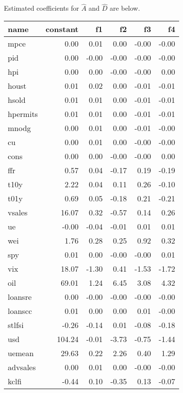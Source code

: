 \documentclass[11pt, letterpaper]{article}\usepackage[]{graphicx}\usepackage[]{color}
\begin{document}
Estimated coefficients for $\widehat{A}$ and $\widehat{D}$ are below.
\begin{table}[H]
\centering
\begingroup\footnotesize
\begin{tabular}{lrrrrr}
  \hline
name & constant & f1 & f2 & f3 & f4 \\ 
  \hline
mpce & 0.00 & 0.01 & 0.00 & -0.00 & -0.00 \\ 
  pid & 0.00 & -0.00 & -0.00 & -0.00 & -0.00 \\ 
  hpi & 0.00 & 0.00 & -0.00 & -0.00 & 0.00 \\ 
  houst & 0.01 & 0.02 & 0.00 & -0.01 & -0.01 \\ 
  hsold & 0.01 & 0.01 & 0.00 & -0.01 & -0.01 \\ 
  hpermits & 0.01 & 0.01 & 0.00 & -0.01 & -0.01 \\ 
  mnodg & 0.00 & 0.01 & 0.00 & -0.01 & -0.00 \\ 
  cu & 0.00 & 0.01 & 0.00 & -0.00 & -0.00 \\ 
  cons & 0.00 & 0.00 & -0.00 & -0.00 & 0.00 \\ 
  ffr & 0.57 & 0.04 & -0.17 & 0.19 & -0.19 \\ 
  t10y & 2.22 & 0.04 & 0.11 & 0.26 & -0.10 \\ 
  t01y & 0.69 & 0.05 & -0.18 & 0.21 & -0.21 \\ 
  vsales & 16.07 & 0.32 & -0.57 & 0.14 & 0.26 \\ 
  ue & -0.00 & -0.04 & -0.01 & 0.01 & 0.01 \\ 
  wei & 1.76 & 0.28 & 0.25 & 0.92 & 0.32 \\ 
  spy & 0.01 & 0.00 & -0.00 & -0.00 & 0.01 \\ 
  vix & 18.07 & -1.30 & 0.41 & -1.53 & -1.72 \\ 
  oil & 69.01 & 1.24 & 6.45 & 3.08 & 4.32 \\ 
  loansre & 0.00 & -0.00 & -0.00 & -0.00 & -0.00 \\ 
  loanscc & 0.01 & 0.00 & 0.00 & 0.01 & -0.00 \\ 
  stlfsi & -0.26 & -0.14 & 0.01 & -0.08 & -0.18 \\ 
  usd & 104.24 & -0.01 & -3.73 & -0.75 & -1.44 \\ 
  uemean & 29.63 & 0.22 & 2.26 & 0.40 & 1.29 \\ 
  advsales & 0.00 & 0.01 & 0.00 & -0.00 & -0.00 \\ 
  kclfi & -0.44 & 0.10 & -0.35 & 0.13 & -0.07 \\ 

\end{tabular}
\end{table}
\end{document}
